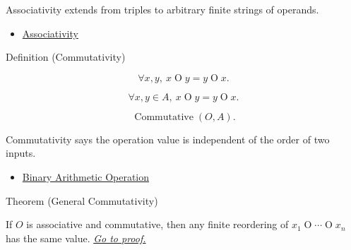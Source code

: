 \begin{remark*}[Interpretation]
Associativity extends from triples to arbitrary finite strings of operands.
\end{remark*}

\begin{dependencies}
\begin{itemize}
  \item \hyperref[def:associativity]{Associativity}
\end{itemize}
\end{dependencies}

\begin{definitionbox}{Definition (Commutativity)}
\begin{definition}[Commutativity]
\label{def:commutativity}
\[
\forall x,y,\ x\mathbin{O}y=y\mathbin{O}x.
\]
\end{definition}
\end{definitionbox}

\begin{remark*}
\[
\forall x,y\in A,\ x\mathbin{O}y=y\mathbin{O}x.
\]
\end{remark*}

\begin{remark*}
\[
\operatorname{Commutative}(O,A).
\]
\end{remark*}

\begin{remark*}[Interpretation]
Commutativity says the operation value is independent of the order of two
inputs.
\end{remark*}

\begin{dependencies}
\begin{itemize}
  \item \hyperref[def:binary-arithmetic-operation]{Binary Arithmetic Operation}

\end{itemize}
\end{dependencies}

\begin{theorembox}{Theorem (General Commutativity)}
\begin{theorem}
\label{thm:general-commutativity}
If $O$ is associative and commutative, then any finite reordering of
$x_1\mathbin{O}\cdots\mathbin{O}x_n$ has the same value.
\hyperref[prf:general-commutativity]{\textit{Go to proof.}}
\end{theorem}
\end{theorembox}

